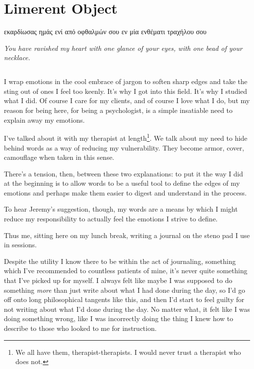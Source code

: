 \chapter{Limerent Object}

\begin{flushright}
{\ChapterFont εκαρδίωσας ημάς ενί από οφθαλμών σου εν μία ενθέματι τραχήλου σου}

\vspace{20pt}

\emph{You have ravished my heart with one glance of your eyes, with one bead of your necklace.}
\end{flushright}

\newpage

\section{}

I wrap emotions in the cool embrace of jargon to soften sharp edges and take the sting out of ones I feel too keenly. It's why I got into this field. It's why I studied what I did. Of course I care for my clients, and of course I love what I do, but my reason for being here, for being a psychologist, is a simple insatiable need to explain away my emotions.

I've talked about it with my therapist at length\footnote{We all have them, therapist-therapists. I would never trust a therapist who does not.}. We talk about my need to hide behind words as a way of reducing my vulnerability. They become armor, cover, camouflage when taken in this sense.

There's a tension, then, between these two explanations: to put it the way I did at the beginning is to allow words to be a useful tool to define the edges of my emotions and perhaps make them easier to digest and understand in the process.

To hear Jeremy's suggestion, though, my words are a means by which I might reduce my responsibility to actually feel the emotions I strive to define.

Thus me, sitting here on my lunch break, writing a journal on the steno pad I use in sessions.

Despite the utility I know there to be within the act of journaling, something which I've recommended to countless patients of mine, it's never quite something that I've picked up for myself. I always felt like maybe I was supposed to do something \emph{more} than just write about what I had done during the day, so I'd go off onto long philosophical tangents like this, and then I'd start to feel guilty for not writing about what I'd done during the day. No matter what, it felt like I was doing something wrong, like I was incorrectly doing the thing I knew how to describe to those who looked to me for instruction.

